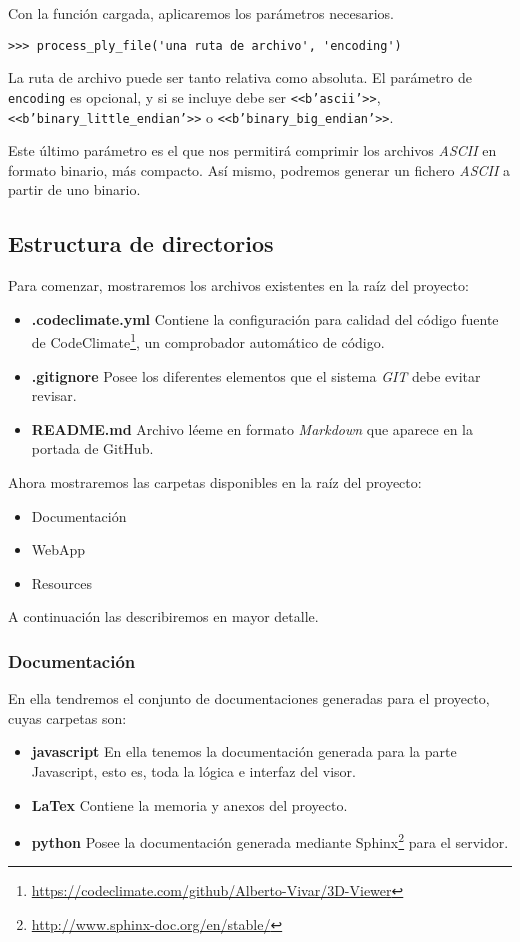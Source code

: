 Con la función cargada, aplicaremos los parámetros necesarios.

\noindent\verb|>>> process_ply_file('una ruta de archivo', 'encoding')|

La ruta de archivo puede ser tanto relativa como absoluta.
El parámetro de \texttt{encoding} es opcional, y si se incluye debe ser \texttt{<<b'ascii'>>}, \texttt{<<b'binary\_little\_endian'>>} o \texttt{<<b{'binary\_big\_endian'}>>}.

Este último parámetro es el que nos permitirá comprimir los archivos \textit{ASCII} en formato binario, más compacto. Así mismo, podremos generar un fichero \textit{ASCII} a partir de uno binario.

\subsection{Estructura de directorios}
\noindent Para comenzar, mostraremos los archivos existentes en la raíz del proyecto:
\begin{itemize}
	\item \textbf{.codeclimate.yml} Contiene la configuración para calidad del código fuente de CodeClimate\footnote{\url{https://codeclimate.com/github/Alberto-Vivar/3D-Viewer}}, un comprobador automático de código.
	\item \textbf{.gitignore} Posee los diferentes elementos que el sistema \textit{GIT} debe evitar revisar.
	\item \textbf{README.md} Archivo léeme en formato \textit{Markdown} que aparece en la portada de GitHub.
\end{itemize}

Ahora mostraremos las carpetas disponibles en la raíz del proyecto:
\begin{itemize}
	\item Documentación
	\item WebApp
	\item Resources
\end{itemize}

\noindent A continuación las describiremos en mayor detalle.

\subsubsection{Documentación}
En ella tendremos el conjunto de documentaciones generadas para el proyecto, cuyas carpetas son:
\begin{itemize}
	\item \textbf{javascript} En ella tenemos la documentación generada para la parte Javascript, esto es, toda la lógica e interfaz del visor.
	\item \textbf{LaTex} Contiene la memoria y anexos del proyecto.
	\item \textbf{python} Posee la documentación generada mediante Sphinx\footnote{\url{http://www.sphinx-doc.org/en/stable/}} para el servidor.
\end{itemize}

